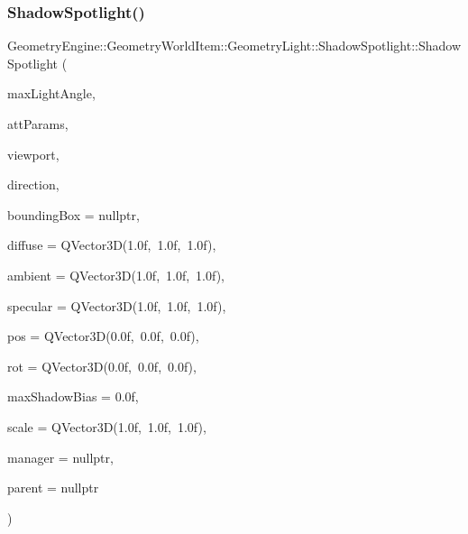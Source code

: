 \subsubsection{\texorpdfstring{ShadowSpotlight()}{ShadowSpotlight()}\hspace{0.1cm}{\footnotesize\ttfamily [1/2]}}
{\footnotesize\ttfamily Geometry\+Engine\+::\+Geometry\+World\+Item\+::\+Geometry\+Light\+::\+Shadow\+Spotlight\+::\+Shadow\+Spotlight (\begin{DoxyParamCaption}\item[{float}]{max\+Light\+Angle,  }\item[{const Q\+Vector3D \&}]{att\+Params,  }\item[{const \mbox{\hyperlink{class_geometry_engine_1_1_geometry_item_utils_1_1_viewport}{Geometry\+Item\+Utils\+::\+Viewport}} \&}]{viewport,  }\item[{const Q\+Vector3D \&}]{direction,  }\item[{\mbox{\hyperlink{class_geometry_engine_1_1_geometry_world_item_1_1_geometry_item_1_1_geometry_item}{Geometry\+Item\+::\+Geometry\+Item}} $\ast$}]{bounding\+Box = {\ttfamily nullptr},  }\item[{const Q\+Vector3D \&}]{diffuse = {\ttfamily QVector3D(1.0f,~1.0f,~1.0f)},  }\item[{const Q\+Vector3D \&}]{ambient = {\ttfamily QVector3D(1.0f,~1.0f,~1.0f)},  }\item[{const Q\+Vector3D \&}]{specular = {\ttfamily QVector3D(1.0f,~1.0f,~1.0f)},  }\item[{const Q\+Vector3D \&}]{pos = {\ttfamily QVector3D(0.0f,~0.0f,~0.0f)},  }\item[{const Q\+Vector3D \&}]{rot = {\ttfamily QVector3D(0.0f,~0.0f,~0.0f)},  }\item[{float}]{max\+Shadow\+Bias = {\ttfamily 0.0f},  }\item[{const Q\+Vector3D \&}]{scale = {\ttfamily QVector3D(1.0f,~1.0f,~1.0f)},  }\item[{const \mbox{\hyperlink{class_geometry_engine_1_1_light_utils_1_1_light_component_manager}{Light\+Utils\+::\+Light\+Component\+Manager}} $\ast$const}]{manager = {\ttfamily nullptr},  }\item[{\mbox{\hyperlink{class_geometry_engine_1_1_geometry_world_item_1_1_world_item}{World\+Item}} $\ast$}]{parent = {\ttfamily nullptr} }\end{DoxyParamCaption})}


